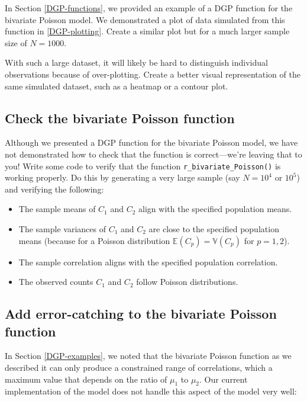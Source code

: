 \documentclass[
]{book}
\providecommand{\tightlist}{%
  \setlength{\itemsep}{0pt}\setlength{\parskip}{0pt}}
\begin{document}
In Section \ref{DGP-functions}, we provided an example of a DGP function for the bivariate Poisson model.
We demonstrated a plot of data simulated from this function in \ref{DGP-plotting}.
Create a similar plot but for a much larger sample size of \(N = 1000\).

With such a large dataset, it will likely be hard to distinguish individual observations because of over-plotting.
Create a better visual representation of the same simulated dataset, such as a heatmap or a contour plot.

\subsection{Check the bivariate Poisson function}\label{BVP-check}

Although we presented a DGP function for the bivariate Poisson model, we have not demonstrated how to check that the function is correct---we're leaving that to you!
Write some code to verify that the function \texttt{r\_bivariate\_Poisson()} is working properly.
Do this by generating a very large sample (say \(N = 10^4\) or \(10^5\)) and verifying the following:

\begin{itemize}
\tightlist
\item
  The sample means of \(C_1\) and \(C_2\) align with the specified population means.
\item
  The sample variances of \(C_1\) and \(C_2\) are close to the specified population means (because for a Poisson distribution \(\mathbb{E}(C_p) = \mathbb{V}(C_p)\) for \(p = 1,2\)).
\item
  The sample correlation aligns with the specified population correlation.
\item
  The observed counts \(C_1\) and \(C_2\) follow Poisson distributions.
\end{itemize}

\subsection{Add error-catching to the bivariate Poisson function}\label{BVP-error}

In Section \ref{DGP-examples}, we noted that the bivariate Poisson function as we described it can only produce a constrained range of correlations, which a maximum value that depends on the ratio of \(\mu_1\) to \(\mu_2\).
Our current implementation of the model does not handle this aspect of the model very well:
\end{document}
